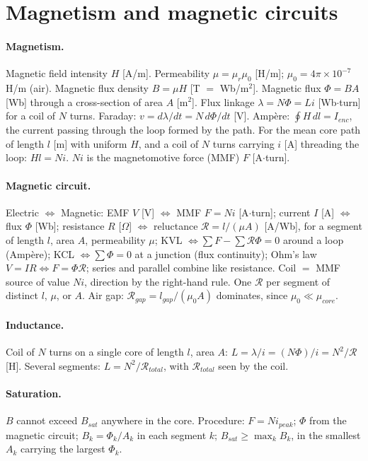 \documentclass{article}
\begin{document}
\section{Magnetism and magnetic circuits}

\paragraph{Magnetism.}
Magnetic field intensity $H$ [A/m].
Permeability $\mu = \mu_r\mu_0$ [H/m]; $\mu_0 = 4\pi\times10^{-7}$ H/m (air).
Magnetic flux density $B = \mu H$ [T $=$ Wb/m$^2$].
Magnetic flux $\Phi = BA$ [Wb] through a cross-section of area $A$ [m$^2$].
Flux linkage $\lambda = N\Phi = Li$ [Wb$\cdot$turn] for a coil of $N$ turns.
Faraday: $v = d\lambda/dt = N\,d\Phi/dt$ [V].
Ampère: $\oint H\,dl = I_{enc}$, the current passing through the loop formed by the path.
For the mean core path of length $l$ [m] with uniform $H$, and a coil of $N$ turns carrying $i$ [A] threading the loop: $Hl = Ni$.
$Ni$ is the magnetomotive force (MMF) $F$ [A$\cdot$turn].

\paragraph{Magnetic circuit.}
Electric $\iff$ Magnetic:
EMF $V$ [V] $\iff$ MMF $F = Ni$ [A$\cdot$turn];
current $I$ [A] $\iff$ flux $\Phi$ [Wb];
resistance $R$ [$\Omega$] $\iff$ reluctance $\mathcal R = l/(\mu A)$ [A/Wb], for a segment of length $l$, area $A$, permeability $\mu$;
KVL $\iff \sum F - \sum\mathcal R\Phi = 0$ around a loop (Ampère);
KCL $\iff \sum\Phi = 0$ at a junction (flux continuity);
Ohm's law $V = IR \iff F = \Phi\mathcal R$; series and parallel combine like resistance.
Coil $=$ MMF source of value $Ni$, direction by the right-hand rule.
One $\mathcal R$ per segment of distinct $l$, $\mu$, or $A$.
Air gap: $\mathcal R_{gap} = l_{gap}/(\mu_0 A)$ dominates, since $\mu_0 \ll \mu_{core}$.

\paragraph{Inductance.}
Coil of $N$ turns on a single core of length $l$, area $A$:
$L = \lambda / i = (N\Phi) / i = N^2/\mathcal R$ [H].
Several segments: $L = N^2/\mathcal R_{total}$, with $\mathcal R_{total}$ seen by the coil.

\paragraph{Saturation.}
$B$ cannot exceed $B_{sat}$ anywhere in the core.
Procedure: $F = Ni_{peak}$; $\Phi$ from the magnetic circuit; $B_k = \Phi_k/A_k$ in each segment $k$; $B_{sat} \ge \max_k B_k$, in the smallest $A_k$ carrying the largest $\Phi_k$.
\end{document}
